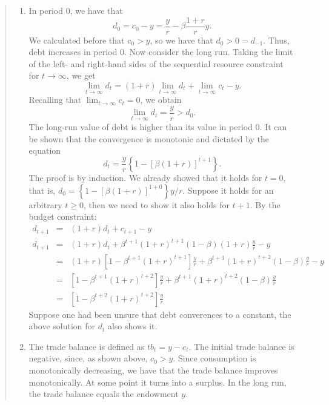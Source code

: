 \begin{exercise}
\begin{quote}
\begin{enumerate}
\item 
In period 0, we have that 
\[
d_0 = c_0-y=\frac yr - \beta \frac{1+r}ry. 
\]
We calculated before that $c_0>y$, so we have that  $d_0>0=d_{-1}$. Thus, debt increases in period 0. Now consider the long run. Taking the limit
of the left- and right-hand sides of the sequential resource constraint for $t\rightarrow \infty$, we get
\[
\lim_{t\rightarrow \infty}d_t
 =
 (1+r) \lim_{t\rightarrow \infty}d_t+\lim_{t\rightarrow \infty}c_t -y.
\]
Recalling that $\lim_{t\rightarrow \infty}c_t=0$, we obtain
\[\lim_{t\rightarrow \infty}d_t = \frac yr>d_0.\]
The long-run value of debt is higher than its value in period 0. It can be shown that the convergence is monotonic and dictated by the equation
\[
d_t = \frac yr
\left\{
1-[\beta (1+r)]^{t+1}
\right\}.
\]
The proof is by induction. We already showed that it holds for $t=0$, that is, $d_0 = \left\{1-[\beta(1+r)]^{1+0}\right\}y/r$. Suppose it holds for an arbitrary $t \ge 0$, then we need to show it also holds for $t+1$. By the budget constraint: 
\begin{eqnarray*}
d_{t+1} & = & (1+r) d_t + c_{t+1} - y\\
d_{t+1} & = & (1+r) d_t + \beta^{t+1}(1+r)^{t+1} (1-\beta) (1+r) \frac{y}{r} - y\\
&= & (1+r) \left[1-\beta^{t+1}(1+r)^{t+1}\right] \frac{y}{r}+ \beta^{t+1}(1+r)^{t+2} (1 - \beta) \frac{y}{r} - y\\
&=& \left[1-\beta^{t+1}(1+r)^{t+2}\right] \frac{y}{r}+ \beta^{t+1}(1+r)^{t+2} (1 - \beta) \frac{y}{r}\\
&=& \left[1-\beta^{t+2}(1+r)^{t+2}\right] \frac{y}{r}
\end{eqnarray*}
Suppose one had been unsure that debt converences to a constant, the above solution for $d_t$ also shows it. 

\item 
The trade balance is defined as $tb_t = y-c_t$. 
The initial trade balance is negative, since, as shown above, $c_0>y$. Since consumption is monotonically decreasing, we have that the trade balance  improves monotonically. At some point it turns into a surplus. In the long run, the trade balance equals the endowment $y$. 
\end{enumerate}
\end{quote}
\end{exercise}

